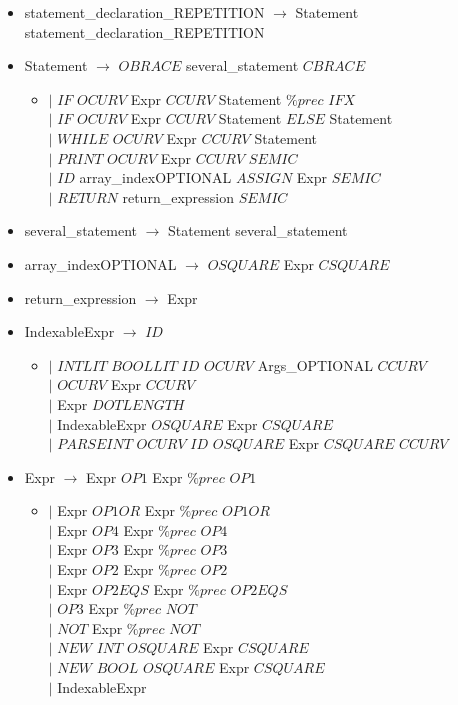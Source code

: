 \documentclass[12pt]{article}
\begin{document}
\begin{itemize}
  \item[] statement\_declaration\_REPETITION $\longrightarrow$ Statement statement\_declaration\_REPETITION
  
  \item[] Statement $\longrightarrow$ $OBRACE$ several\_statement $CBRACE$
  \begin{itemize}
  \item[]$|$ $IF$ $OCURV$ Expr $CCURV$ Statement $\%prec$ $IFX$ 
  \\$|$ $IF$ $OCURV$ Expr $CCURV$ Statement $ELSE$ Statement 
  \\$|$ $WHILE$ $OCURV$ Expr $CCURV$ Statement 
  \\$|$ $PRINT$ $OCURV$ Expr $CCURV$ $SEMIC$ 
  \\$|$ $ID$ array\_indexOPTIONAL $ASSIGN$ Expr $SEMIC$ 
  \\$|$ $RETURN$ return\_expression $SEMIC$  
    \end{itemize}
  
  \item[] several\_statement $\longrightarrow$ Statement several\_statement  
  
  \item[] array\_indexOPTIONAL $\longrightarrow$  $OSQUARE$ Expr $CSQUARE$
  
  \item[] return\_expression $\longrightarrow$  Expr
  
  \item[] IndexableExpr $\longrightarrow$ $ID$ 
  \begin{itemize}
  \item[]$|$ $INTLIT$ $BOOLLIT$ $ID$ $OCURV$ Args\_OPTIONAL $CCURV$ 
  \\$|$ $OCURV$ Expr $CCURV$ 
  \\$|$ Expr $DOTLENGTH$ 
  \\$|$ IndexableExpr $OSQUARE$ Expr $CSQUARE$ 
  \\$|$ $PARSEINT$ $OCURV$ $ID$ $OSQUARE$ Expr $CSQUARE$ $CCURV$
    \end{itemize}
  
  \item[] Expr $\longrightarrow$ Expr $OP1$ Expr $\%prec$ $OP1$ 
  \begin{itemize}
		\item[] $|$      Expr $OP1OR$ Expr $\%prec$ $OP1OR$
		\\$|$ Expr $OP4$ Expr $\%prec$ $OP4$ 
		\\$|$ Expr $OP3$ Expr $\%prec$ $OP3$  
		\\$|$ Expr $OP2$ Expr $\%prec$ $OP2$ 
		\\$|$ Expr $OP2EQS$ Expr $\%prec$ $OP2EQS$
		\\$|$ $OP3$ Expr $\%prec$ $NOT$
		\\$|$ $NOT$ Expr $\%prec$ $NOT$
		\\$|$ $NEW$ $INT$ $OSQUARE$ Expr $CSQUARE$
		\\$|$ $NEW$ $BOOL$ $OSQUARE$ Expr $CSQUARE$
		\\$|$ IndexableExpr
  \end{itemize}
  

\end{itemize}
\end{document}
